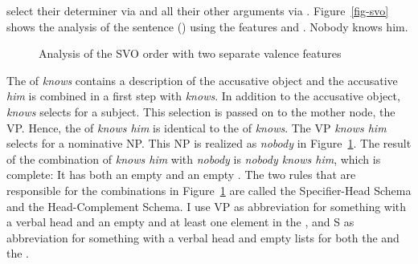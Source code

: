 select their determiner via \spr and all their other arguments via \comps. Figure~\vref{fig-svo}
shows the analysis of the sentence () using the features \spr and \comps.
\ea
Nobody knows him.
\z
\begin{figure}
\caption{\label{fig-svo}Analysis of the SVO order with two separate valence features}
\end{figure}
The \compsl of \emph{knows} contains a description of the accusative object and the accusative
\emph{him} is combined in a first step with \emph{knows}. In addition to the accusative object,
\emph{knows} selects for a subject. This selection is passed on to the mother node, the VP. Hence,
the \sprv of \emph{knows him} is identical to the \sprv of \emph{knows}. The VP \emph{knows him}
selects for a nominative NP. This NP is realized as \emph{nobody} in Figure~\ref{fig-svo}. The
result of the combination of \emph{knows him} with \emph{nobody} is \emph{nobody knows him}, which
is complete: It has both an empty \sprl and an empty \compsl. The two rules that are responsible for
the combinations in Figure~\ref{fig-svo} are called the Specifier-Head Schema and the
Head-Complement Schema. I use VP as abbreviation for something with a verbal head and an empty \compsl and at least
one element in the \sprl, and S as abbreviation for something with a verbal head and empty lists for
both the \spr and the \compsv.

